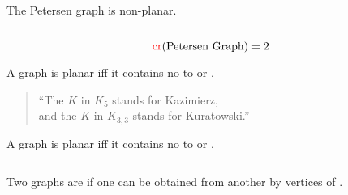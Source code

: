 \begin{frame}{}
  \begin{theorem}
    The Petersen graph is non-planar.
  \end{theorem}

  \begin{columns}
      \pause
  \end{columns}

  \pause
  \[
    \textcolor{red}{\text{cr}}(\text{Petersen Graph}) = 2
  \]
\end{frame}

\begin{frame}{}
  \begin{theorem}
    A graph is planar iff it contains no 
     to  or .
  \end{theorem}

  \pause

  \pause
  \begin{quote}
    \begin{center}
      ``The $K$ in $K_{5}$ stands for Kazimierz,\\
      and the $K$ in $K_{3, 3}$ stands for Kuratowski.''
    \end{center}
  \end{quote}
\end{frame}

\begin{frame}{}
  \begin{theorem}
    A graph is planar iff it contains no 
     to  or .
  \end{theorem}

  \pause
  \begin{columns}
  \end{columns}

  \begin{definition}[Homeomorphic]
    Two graphs are  if
    one can be obtained from another by 
    vertices of .
  \end{definition}
\end{frame}

